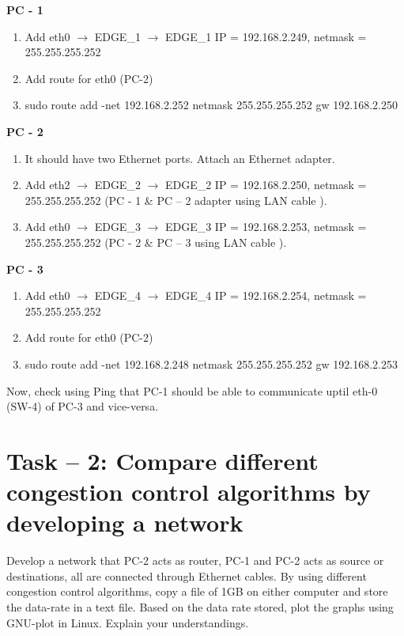 \documentclass[letterpaper,10pt,english]{sphinxmanual}
\begin{document}
\textbf{PC - 1}
\begin{enumerate}
\item {} 
Add eth0 \(\rightarrow\) EDGE\_1 \(\rightarrow\) EDGE\_1 IP = 192.168.2.249, netmask = 255.255.255.252

\item {} 
Add route for eth0 (PC-2)

\item {} 
sudo route add -net 192.168.2.252 netmask 255.255.255.252 gw 192.168.2.250

\end{enumerate}

\textbf{PC - 2}
\begin{enumerate}
\item {} 
It should have two Ethernet ports. Attach an Ethernet adapter.

\item {} 
Add eth2 \(\rightarrow\) EDGE\_2 \(\rightarrow\) EDGE\_2 IP = 192.168.2.250, netmask = 255.255.255.252 (PC - 1 \& PC – 2 adapter using LAN cable ).

\item {} 
Add eth0 \(\rightarrow\) EDGE\_3 \(\rightarrow\) EDGE\_3 IP = 192.168.2.253, netmask = 255.255.255.252 (PC - 2 \& PC – 3 using LAN cable ).

\end{enumerate}

\textbf{PC - 3}
\begin{enumerate}
\item {} 
Add eth0 \(\rightarrow\) EDGE\_4 \(\rightarrow\) EDGE\_4 IP = 192.168.2.254, netmask = 255.255.255.252

\item {} 
Add route for eth0 (PC-2)

\item {} 
sudo route add -net 192.168.2.248 netmask 255.255.255.252 gw 192.168.2.253

\end{enumerate}

Now, check using Ping that PC-1 should be able to communicate uptil eth-0 (SW-4) of PC-3 and vice-versa.


\section{Task – 2: Compare different congestion control algorithms by developing a network}
\label{week-07:task-2-compare-different-congestion-control-algorithms-by-developing-a-network}
Develop a network that PC-2 acts as router, PC-1 and PC-2 acts as source or destinations, all are connected through Ethernet cables. By using different congestion control algorithms, copy a file of 1GB on either computer and store the data-rate in a text file. Based on the data rate stored, plot the graphs using GNU-plot in Linux. Explain your understandings.
\end{document}
